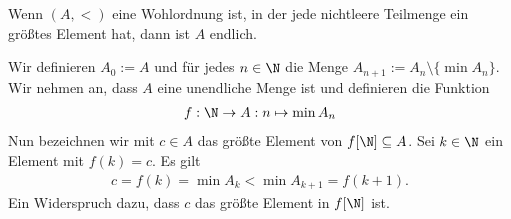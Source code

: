 
\begin{exercise}[237]
	Wenn $(A, <)$ eine Wohlordnung ist, in der jede nichtleere Teilmenge ein größtes Element hat, dann ist $A$ endlich.

\end{exercise}


\begin{solution}
	Wir definieren $A_0 := A$ und für jedes $n \in \N$ die Menge $A_{n + 1} := A_n \setminus \{\min A_n\}$. Wir nehmen an, dass $A$ eine unendliche Menge ist und definieren die Funktion
	\begin{align*}
		f:\N \to A: n \mapsto \min A_n
	\end{align*}
	Nun bezeichnen wir mit $c \in A$ das größte Element von $f[\N] \subseteq A$. Sei $k \in \N$ ein Element mit $f(k) = c$. Es gilt
	\begin{align*}
		c = f(k) = \min A_k < \min A_{k + 1} = f(k + 1).
	\end{align*}
	Ein Widerspruch dazu, dass $c$ das größte Element in $f[\N]$ ist.

\end{solution}
